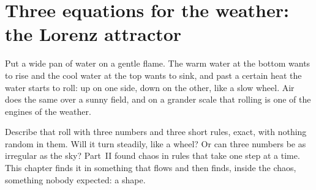 
\chapter{Three equations for the weather: the Lorenz attractor}
\label{ch:lorenz}

\noindent
Put a wide pan of water on a gentle flame. The warm water at the bottom
wants to rise and the cool water at the top wants to sink, and past a certain
heat the water starts to roll: up on one side, down on the other, like a
slow wheel. Air does the same over a sunny field, and on a grander scale that
rolling is one of the engines of the weather.

Describe that roll with three numbers and three short rules, exact, with
nothing random in them. Will it turn steadily, like a wheel? Or can three
numbers be as irregular as the sky? Part~II found chaos in rules that take
one step at a time. This chapter finds it in something that flows \dash{} and
then finds, inside the chaos, something nobody expected: a shape.

\begin{outcomes}
\end{outcomes}


